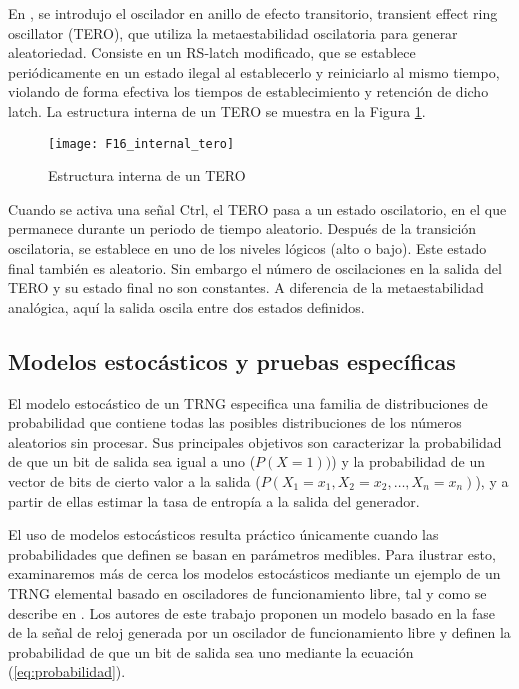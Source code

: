                 En \cite{Varchola2010}, se introdujo el oscilador en anillo de efecto transitorio, transient effect ring oscillator (TERO), que utiliza la metaestabilidad oscilatoria para generar aleatoriedad. Consiste en un RS-latch modificado, que se establece periódicamente en un estado ilegal al establecerlo y reiniciarlo al mismo tiempo, violando de forma efectiva los tiempos de establecimiento y retención de dicho latch. La estructura interna de un TERO se muestra en la Figura \ref{fig:F16_internal_tero}.

                \begin{figure}[hbtp]
                    \caption{Estructura interna de un TERO}
                    \centering
                    \texttt{[image: F16\_internal\_tero]}
                    \label{fig:F16_internal_tero}
                \end{figure}

                Cuando se activa una señal Ctrl, el TERO pasa a un estado oscilatorio, en el que permanece durante un periodo de tiempo aleatorio. Después de la transición oscilatoria, se establece en uno de los niveles lógicos (alto o bajo). Este estado final también es aleatorio. Sin embargo el número de oscilaciones en la salida del TERO y su estado final no son constantes. A diferencia de la metaestabilidad analógica, aquí la salida oscila entre dos estados definidos.

        \subsection{Modelos estocásticos y pruebas específicas}

            El modelo estocástico de un TRNG especifica una familia de distribuciones de probabilidad que contiene todas las posibles distribuciones de los números aleatorios sin procesar. Sus principales objetivos son caracterizar la probabilidad de que un bit de salida sea igual a uno ($P(X = 1))$) y la probabilidad de un vector de bits de cierto valor a la salida ($P(X_1 = x_1, X_2 = x_2, \ldots, X_n = x_n)$), y a partir de ellas estimar la tasa de entropía a la salida del generador.

            El uso de modelos estocásticos resulta práctico únicamente cuando las probabilidades que definen se basan en parámetros medibles. Para ilustrar esto, examinaremos más de cerca los modelos estocásticos mediante un ejemplo de un TRNG elemental basado en osciladores de funcionamiento libre, tal y como se describe en \cite{Baudet2010}. Los autores de este trabajo proponen un modelo basado en la fase de la señal de reloj generada por un oscilador de funcionamiento libre y definen la probabilidad de que un bit de salida sea uno mediante la ecuación (\ref{eq:probabilidad}).

